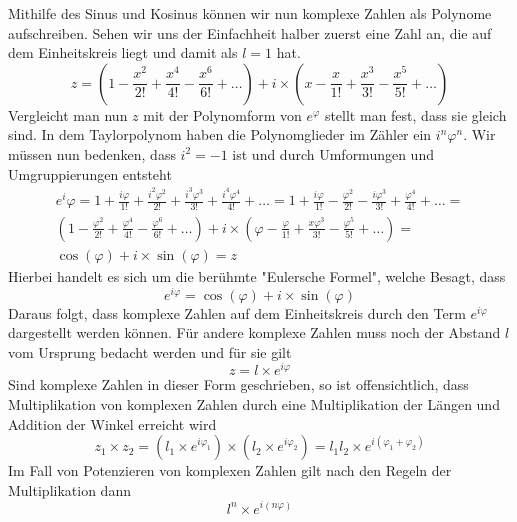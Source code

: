 \documentclass[a4paper,12pt]{article} %
\begin{document}
Mithilfe des Sinus und Kosinus können wir nun komplexe Zahlen als Polynome aufschreiben. Sehen wir uns der Einfachheit halber zuerst eine Zahl an, die auf dem Einheitskreis liegt und damit als $l=1$ hat.
\begin{equation}
	z=%
	\left(1-\frac{x^2}{2!}+\frac{x^4}{4!}-\frac{x^6}{6!}+\dots\right)+i\times\left(x-\frac{x}{1!}+\frac{x^3}{3!}-\frac{x^5}{5!}+\dots\right)
\end{equation}
Vergleicht man nun $z$ mit der Polynomform von $e^\varphi$ stellt man fest, dass sie gleich sind. 
In dem Taylorpolynom haben die Polynomglieder im Zähler ein $i^n\varphi^n$. Wir müssen nun bedenken, dass $i^2=-1$ ist und durch Umformungen und Umgruppierungen entsteht
\begin{multline}
	e^i\varphi=1+\frac{i\varphi}{1!}+\frac{i^2\varphi^2}{2!}+\frac{i^3\varphi^3}{3!}+\frac{i^4\varphi^4}{4!}+\dots=
	1+\frac{i\varphi}{1!}-\frac{\varphi^2}{2!}-\frac{i\varphi^3}{3!}+\frac{\varphi^4}{4!}+\dots=\\
	\left(1-\frac{\varphi^2}{2!}+\frac{\varphi^4}{4!}-\frac{\varphi^6}{6!}+\dots\right)+i\times\left(\varphi-\frac{\varphi}{1!}+\frac{x\varphi^3}{3!}-\frac{\varphi^5}{5!}+\dots\right) =\\
	\cos(\varphi) + i\times\sin(\varphi)=z
\end{multline}
Hierbei handelt es sich um die berühmte "{Eulersche Formel}", welche Besagt, dass
\[e^{i\varphi}=\cos(\varphi)+i\times\sin(\varphi)\]
Daraus folgt, dass komplexe Zahlen auf dem Einheitskreis durch den Term $e^{i\varphi}$ dargestellt werden können. Für andere komplexe Zahlen muss noch der Abstand $l$ vom Ursprung bedacht werden und für sie gilt
\[z=l\times e^{i\varphi}\]
Sind komplexe Zahlen in dieser Form geschrieben, so ist offensichtlich, dass Multiplikation von komplexen Zahlen durch eine Multiplikation der Längen und Addition der Winkel erreicht wird
\[z_1\times z_2=(l_1 \times e^{i\varphi_1}) \times (l_2 \times e^{i\varphi_2})=l_1 l_2 \times e^{i(\varphi_1+\varphi_2)}\]
Im Fall von Potenzieren von komplexen Zahlen gilt nach den Regeln der Multiplikation dann
\[l^n \times e^{i(n\varphi)}\]
\end{document}
